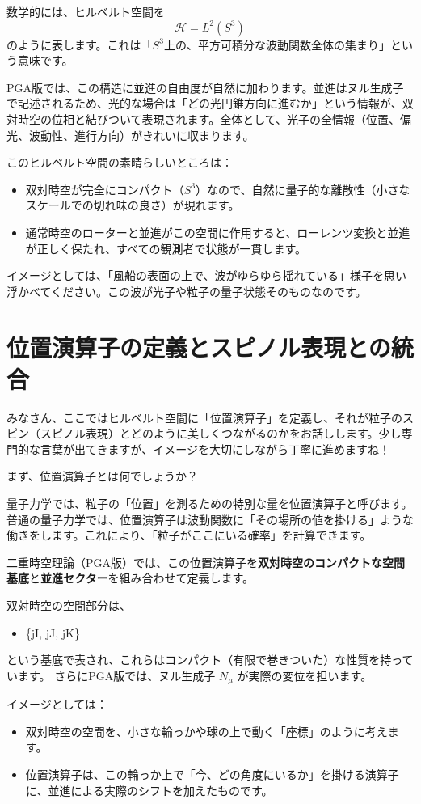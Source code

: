 \documentclass[dvipdfmx,a4paper,oneside]{jsbook}
\begin{document}
数学的には、ヒルベルト空間を
\[
\mathcal{H} = L^2(S^3)
\]
のように表します。これは「\(S^3\)上の、平方可積分な波動関数全体の集まり」という意味です。

PGA版では、この構造に並進の自由度が自然に加わります。並進はヌル生成子で記述されるため、光的な場合は「どの光円錐方向に進むか」という情報が、双対時空の位相と結びついて表現されます。全体として、光子の全情報（位置、偏光、波動性、進行方向）がきれいに収まります。

このヒルベルト空間の素晴らしいところは：
\begin{itemize}
  \item 双対時空が完全にコンパクト（\(S^3\)）なので、自然に量子的な離散性（小さなスケールでの切れ味の良さ）が現れます。
  \item 通常時空のローターと並進がこの空間に作用すると、ローレンツ変換と並進が正しく保たれ、すべての観測者で状態が一貫します。
\end{itemize}

イメージとしては、「風船の表面の上で、波がゆらゆら揺れている」様子を思い浮かべてください。この波が光子や粒子の量子状態そのものなのです。

\section{位置演算子の定義とスピノル表現との統合}

みなさん、ここではヒルベルト空間に「位置演算子」を定義し、それが粒子のスピン（スピノル表現）とどのように美しくつながるのかをお話しします。少し専門的な言葉が出てきますが、イメージを大切にしながら丁寧に進めますね！

まず、位置演算子とは何でしょうか？

量子力学では、粒子の「位置」を測るための特別な量を位置演算子と呼びます。普通の量子力学では、位置演算子は波動関数に「その場所の値を掛ける」ような働きをします。これにより、「粒子がここにいる確率」を計算できます。

二重時空理論（PGA版）では、この位置演算子を\textbf{双対時空のコンパクトな空間基底}と\textbf{並進セクター}を組み合わせて定義します。

双対時空の空間部分は、
\begin{itemize}
  \item \{jI, jJ, jK\}
\end{itemize}
という基底で表され、これらはコンパクト（有限で巻きついた）な性質を持っています。  
さらにPGA版では、ヌル生成子 \(N_\mu\) が実際の変位を担います。

イメージとしては：
\begin{itemize}
  \item 双対時空の空間を、小さな輪っかや球の上で動く「座標」のように考えます。
  \item 位置演算子は、この輪っか上で「今、どの角度にいるか」を掛ける演算子に、並進による実際のシフトを加えたものです。
\end{itemize}
\end{document}
